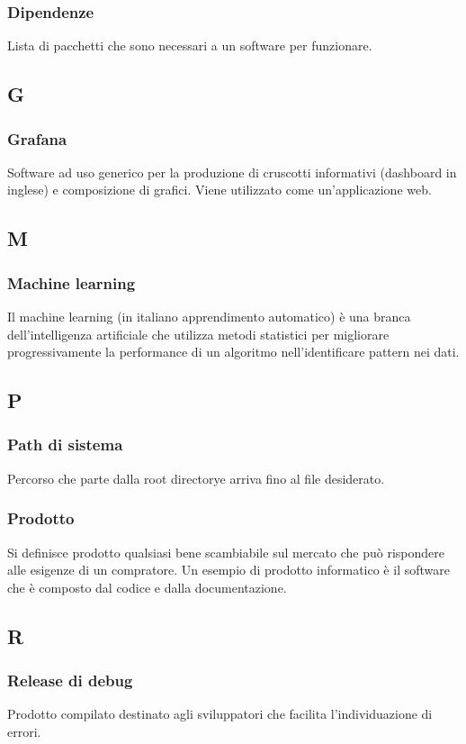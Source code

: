 \subsubsection*{Dipendenze}
Lista di pacchetti che sono necessari a un software per funzionare.

\subsection*{G}
\subsubsection*{Grafana}
Software ad uso generico per la produzione di cruscotti informativi (dashboard in inglese) e composizione di grafici. Viene utilizzato come un'applicazione web.

\subsection*{M}
\subsubsection*{Machine learning}
Il machine learning (in italiano apprendimento automatico) è una branca dell'intelligenza artificiale che utilizza metodi statistici per migliorare progressivamente la performance di un algoritmo nell'identificare pattern nei dati.

\subsection*{P}
\subsubsection*{Path di sistema}
Percorso che parte dalla root directory\glosp e arriva fino al file desiderato.
\subsubsection*{Prodotto}
Si definisce prodotto qualsiasi bene scambiabile sul mercato che può rispondere alle esigenze di un compratore. Un esempio di prodotto informatico è il software che è composto dal codice e dalla documentazione.	
	
\subsection*{R}
\subsubsection*{Release di debug}
Prodotto compilato destinato agli sviluppatori che facilita l'individuazione di errori.

